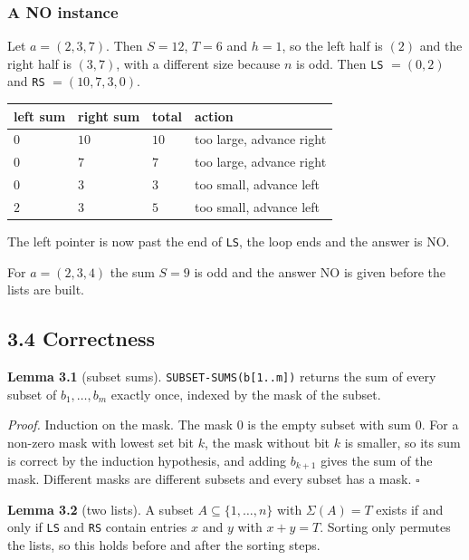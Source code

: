 \documentclass[
]{article}
\begin{document}
\hypertarget{a-no-instance-1}{%
\subsubsection{A NO instance}\label{a-no-instance-1}}

Let \(a = (2, 3, 7)\). Then \(S = 12\), \(T = 6\) and \(h = 1\), so the
left half is \((2)\) and the right half is \((3, 7)\), with a different
size because \(n\) is odd. Then \texttt{LS} \(= (0, 2)\) and \texttt{RS}
\(= (10, 7, 3, 0)\).

\begin{longtable}[]{@{}llll@{}}
\toprule
left sum & right sum & total & action \\
\midrule
\endhead
\(0\) & \(10\) & \(10\) & too large, advance right \\
\midrule
\(0\) & \(7\) & \(7\) & too large, advance right \\
\midrule
\(0\) & \(3\) & \(3\) & too small, advance left \\
\midrule
\(2\) & \(3\) & \(5\) & too small, advance left \\
\bottomrule
\end{longtable}

The left pointer is now past the end of \texttt{LS}, the loop ends and
the answer is NO.

For \(a = (2, 3, 4)\) the sum \(S = 9\) is odd and the answer NO is
given before the lists are built.

\hypertarget{correctness-1}{%
\subsection{3.4 Correctness}\label{correctness-1}}

\textbf{Lemma 3.1} (subset sums). \texttt{SUBSET-SUMS(b{[}1..m{]})}
returns the sum of every subset of \(b_1, \dots, b_m\) exactly once,
indexed by the mask of the subset.

\emph{Proof.} Induction on the mask. The mask \(0\) is the empty subset
with sum \(0\). For a non-zero mask with lowest set bit \(k\), the mask
without bit \(k\) is smaller, so its sum is correct by the induction
hypothesis, and adding \(b_{k+1}\) gives the sum of the mask. Different
masks are different subsets and every subset has a mask. \(\square\)

\textbf{Lemma 3.2} (two lists). A subset
\(A \subseteq \lbrace 1, \dots, n \rbrace\) with \(\Sigma(A) = T\)
exists if and only if \texttt{LS} and \texttt{RS} contain entries \(x\)
and \(y\) with \(x + y = T\). Sorting only permutes the lists, so this
holds before and after the sorting steps.
\end{document}
